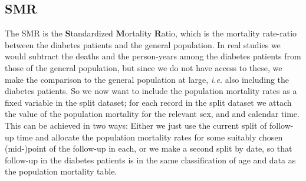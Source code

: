 \subsection*{SMR}
The SMR is the \textbf{S}tandardized \textbf{M}ortality
\textbf{R}atio, which is the mortality rate-ratio between the diabetes
patients and the general population.  In real studies we would
subtract the deaths and the person-years among the diabetes patients
from those of the general population, but since we do not have access
to these, we make the comparison to the general population at large,
\textit{i.e.} also including the diabetes patients.
So we now want to include the population mortality rates as a fixed
variable in the split dataset; for each record in the split dataset we
attach the value of the population mortality for the relevant sex, and
and calendar time.
This can be achieved in two ways: Either we just use the current split
of follow-up time and allocate the population mortality rates for some
suitably chosen (mid-)point of the follow-up in each, or we make a
second split by date, so that follow-up in the diabetes patients is in
the same classification of age and data as the population mortality
table.
